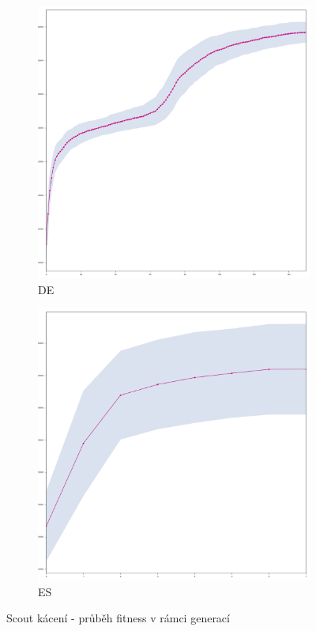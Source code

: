 		\begin{figure}[p]
			\centering
			\begin{subfigure}{.5\textwidth}
				\centering
				\includegraphics[width=\linewidth]{../img/WoodMap/DE/graph_of_CuttorCut-mean.png}
				\caption{DE}
				\label{obr04:CutDE}
			\end{subfigure}%
			\begin{subfigure}{.5\textwidth}
				\centering
				\includegraphics[width=\linewidth]{../img/WoodMap/ES/WoodCutES-mean.png}
				\caption{ES}
				\label{obr04:CutES}
			\end{subfigure}
			\caption{Scout kácení - průběh fitness v rámci generací}
			\label{obr04:Cut}
		\end{figure}
		\clearpage

